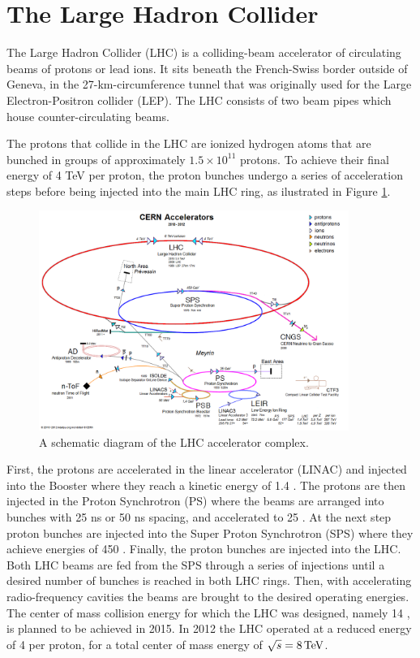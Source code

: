 \section{The Large Hadron Collider}

The Large Hadron Collider (LHC) \cite{Evans:2008zzb,Bruning:2004ej} is a colliding-beam accelerator 
of circulating beams of protons
or lead ions. 
It sits beneath the French-Swiss border outside of Geneva, in the 27-km-circumference tunnel that was originally used
for the Large Electron-Positron collider (LEP). 
 The LHC consists of two beam pipes which house counter-circulating beams.

The protons that collide in the LHC are ionized hydrogen atoms that are bunched in groups
of approximately $1.5\times10^{11}$ protons. To achieve their final energy of 4 TeV per proton,
the proton bunches undergo a series of acceleration steps before being injected into
the main LHC ring, as ilustrated in Figure \ref{fig:accelerators}.

\begin{figure}[htbp]
\centering
\includegraphics[width=0.9\textwidth]{plots/intro/accelerators.png}
\caption{A schematic diagram of the LHC accelerator complex.\label{fig:accelerators}}
\end{figure}

First, the protons are accelerated in the linear accelerator (LINAC) and injected into 
the Booster where they reach a kinetic energy of 1.4 \GeV. The protons are then injected
in the Proton Synchrotron (PS) where the beams are arranged into bunches
with 25 ns or 50 ns spacing, and accelerated to 25 \GeV. At the next step
 proton bunches are injected
into the Super Proton Synchrotron (SPS) where they achieve energies of 450 \GeV. Finally, the proton
bunches are injected into the LHC. Both LHC beams are fed from the SPS through a series of injections
until a desired number of bunches is reached in both LHC rings. Then, with accelerating 
radio-frequency cavities the beams are brought to the desired operating energies.
The center of mass collision energy for which the LHC was designed, namely 14 \TeV,
 is planned to be achieved in 2015.
In 2012 the LHC operated at a reduced energy of 4 \TeV per proton, for a total
center of mass energy of $\sqrt{s} = 8 \,\text{Te\hspace{-.08em}V}$.


